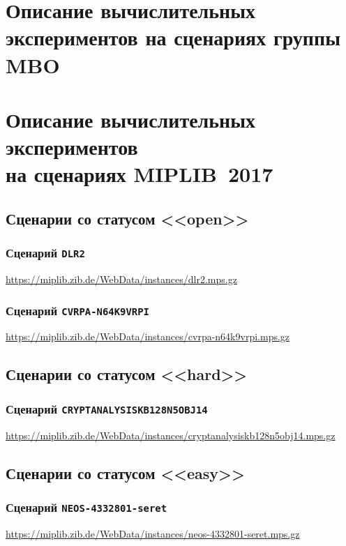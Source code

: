 \documentclass[%
	11pt,
	a4paper,
	utf8,
		]{article}
\begin{document}
\section{Описание вычислительных экспериментов на сценариях группы MBO}

\section{Описание вычислительных экспериментов \\на сценариях MIPLIB~2017}

\subsection{Сценарии со статусом <<open>>}

\subsubsection{Сценарий \texttt{DLR2}}

\url{https://miplib.zib.de/WebData/instances/dlr2.mps.gz}

\subsubsection{Сценарий \texttt{CVRPA-N64K9VRPI}}

\url{https://miplib.zib.de/WebData/instances/cvrpa-n64k9vrpi.mps.gz}

\subsection{Сценарии со статусом <<hard>>}

\subsubsection{Сценарий \texttt{CRYPTANALYSISKB128N5OBJ14}}

\url{https://miplib.zib.de/WebData/instances/cryptanalysiskb128n5obj14.mps.gz}

\subsection{Сценарии со статусом <<easy>>}

\subsubsection{Сценарий \texttt{NEOS-4332801-seret}}

\url{https://miplib.zib.de/WebData/instances/neos-4332801-seret.mps.gz}



\newpage
\listoffigures{}

\listoftables{}

\begin{thebibliography}{99}
\end{thebibliography}
\end{document}
